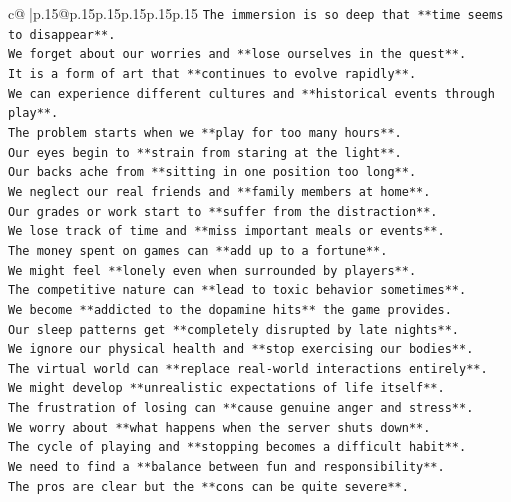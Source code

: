 \documentclass{article}
\begin{document}
{\begin{supertabular}{c@{$\;$}|p{.15\linewidth}@{}p{.15\linewidth}p{.15\linewidth}p{.15\linewidth}p{.15\linewidth}p{.15\linewidth}}
{{{\texttt{The immersion is so deep that **time seems to disappear**.} \\
\texttt{We forget about our worries and **lose ourselves in the quest**.} \\
\texttt{It is a form of art that **continues to evolve rapidly**.} \\
\texttt{We can experience different cultures and **historical events through play**.} \\
\texttt{The problem starts when we **play for too many hours**.} \\
\texttt{Our eyes begin to **strain from staring at the light**.} \\
\texttt{Our backs ache from **sitting in one position too long**.} \\
\texttt{We neglect our real friends and **family members at home**.} \\
\texttt{Our grades or work start to **suffer from the distraction**.} \\
\texttt{We lose track of time and **miss important meals or events**.} \\
\texttt{The money spent on games can **add up to a fortune**.} \\
\texttt{We might feel **lonely even when surrounded by players**.} \\
\texttt{The competitive nature can **lead to toxic behavior sometimes**.} \\
\texttt{We become **addicted to the dopamine hits** the game provides.} \\
\texttt{Our sleep patterns get **completely disrupted by late nights**.} \\
\texttt{We ignore our physical health and **stop exercising our bodies**.} \\
\texttt{The virtual world can **replace real{-}world interactions entirely**.} \\
\texttt{We might develop **unrealistic expectations of life itself**.} \\
\texttt{The frustration of losing can **cause genuine anger and stress**.} \\
\texttt{We worry about **what happens when the server shuts down**.} \\
\texttt{The cycle of playing and **stopping becomes a difficult habit**.} \\
\texttt{We need to find a **balance between fun and responsibility**.} \\
\texttt{The pros are clear but the **cons can be quite severe**.} \\
}}}
\end{supertabular}}
\end{document}
